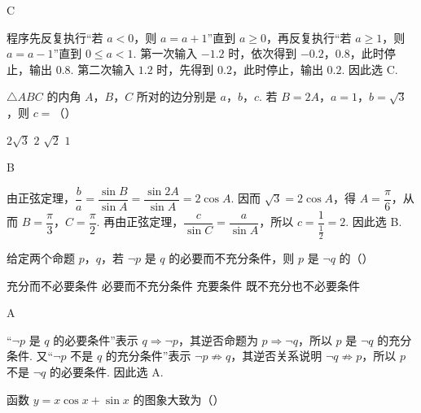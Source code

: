 \begin{answer}
C
\end{answer}

\begin{solution}
程序先反复执行“若 \(a<0\)，则 \(a=a+1\)”直到 \(a\geqslant0\)，再反复执行“若 \(a\geqslant1\)，则 \(a=a-1\)”直到 \(0\leqslant a<1\). 第一次输入 \(-1.2\) 时，依次得到 \(-0.2\)，\(0.8\)，此时停止，输出 \(0.8\). 第二次输入 \(1.2\) 时，先得到 \(0.2\)，此时停止，输出 \(0.2\). 因此选 C.
\end{solution}

\begin{problem}
\(\triangle ABC\) 的内角 \(A\)，\(B\)，\(C\) 所对的边分别是 \(a\)，\(b\)，\(c\). 若 \(B = 2A\)，\(a = 1\)，\(b = \sqrt{3}\)，则 \(c =\)（\quad）

\choices
    {\(2 \sqrt{3}\)}
    {\(2\)}
    {\(\sqrt{2}\)}
    {\(1\)}
\end{problem}

\begin{answer}
B
\end{answer}

\begin{solution}
由正弦定理，\(\dfrac{b}{a}=\dfrac{\sin B}{\sin A}=\dfrac{\sin2A}{\sin A}=2\cos A\). 因而 \(\sqrt{3}=2\cos A\)，得 \(A=\dfrac{\pi}{6}\)，从而 \(B=\dfrac{\pi}{3}\)，\(C=\dfrac{\pi}{2}\). 再由正弦定理，\(\dfrac{c}{\sin C}=\dfrac{a}{\sin A}\)，所以 \(c=\dfrac{1}{\frac{1}{2}}=2\). 因此选 B.
\end{solution}

\begin{problem}
给定两个命题 \( p \)，\( q \)，若 \( \neg p \) 是 \( q \) 的必要而不充分条件，则 \( p \) 是 \( \neg q \) 的（\quad）

\choices
    {充分而不必要条件}
    {必要而不充分条件}
    {充要条件}
    {既不充分也不必要条件}
\end{problem}

\begin{answer}
A
\end{answer}

\begin{solution}
“\(\neg p\) 是 \(q\) 的必要条件”表示 \(q\Rightarrow\neg p\)，其逆否命题为 \(p\Rightarrow\neg q\)，所以 \(p\) 是 \(\neg q\) 的充分条件. 又“\(\neg p\) 不是 \(q\) 的充分条件”表示 \(\neg p\not\Rightarrow q\)，其逆否关系说明 \(\neg q\not\Rightarrow p\)，所以 \(p\) 不是 \(\neg q\) 的必要条件. 因此选 A.
\end{solution}

\begin{problem}
函数 \( y = x \cos x + \sin x \) 的图象大致为（\quad）

    {}
    {}
    {}
\end{problem}


